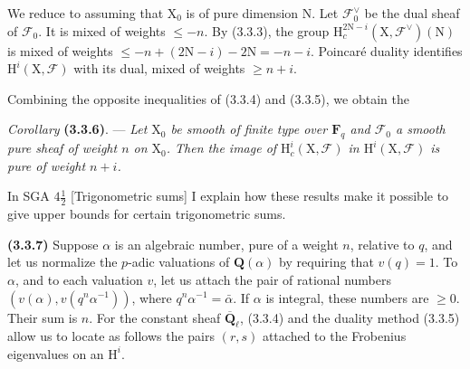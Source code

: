 \documentclass[11pt,leqno]{article}
\begin{document}
We reduce to assuming that \(\mathrm{X}_0\) is of pure dimension \(\mathrm{N}\). Let \(\mathscr{F}_0^\vee\) be the dual sheaf of \(\mathscr{F}_0\). It is mixed of weights \(\leq-n\). By (3.3.3), the group \(\mathrm{H}_c^{2\mathrm{N}-i}(\mathrm{X},\mathscr{F}^\vee)(\mathrm{N})\) is mixed of weights \(\leq-n+(2\mathrm{N}-i)-2\mathrm{N}=-n-i\). Poincaré duality identifies \(\mathrm{H}^i(\mathrm{X},\mathscr{F})\) with its dual, mixed of weights \(\geq n+i\).

Combining the opposite inequalities of (3.3.4) and (3.3.5), we obtain the

\textit{Corollary} \textbf{(3.3.6)}. — \textit{Let \(\mathrm{X}_0\) be smooth of finite type over \(\mathbf{F}_q\) and \(\mathscr{F}_0\) a smooth pure sheaf of weight \(n\) on \(\mathrm{X}_0\). Then the image of \(\mathrm{H}_c^i(\mathrm{X},\mathscr{F})\) in \(\mathrm{H}^i(\mathrm{X},\mathscr{F})\) is pure of weight \(n+i\).}

In SGA \(4\frac{1}{2}\) [Trigonometric sums] I explain how these results make it possible to give upper bounds for certain trigonometric sums.

\textbf{(3.3.7)} Suppose \(\alpha\) is an algebraic number, pure of a weight \(n\), relative to \(q\), and let us normalize the \(p\)-adic valuations of \(\mathbf{Q}(\alpha)\) by requiring that \(v(q)=1\). To \(\alpha\), and to each valuation \(v\), let us attach the pair of rational numbers \((v(\alpha),v(q^n\alpha^{-1}))\), where \(q^n\alpha^{-1}=\bar{\alpha}\). If \(\alpha\) is integral, these numbers are \(\geq0\). Their sum is \(n\). For the constant sheaf \(\overline{\mathbf{Q}}_\ell\), (3.3.4) and the duality method (3.3.5) allow us to locate as follows the pairs \((r,s)\) attached to the Frobenius eigenvalues on an \(\mathrm{H}^i\).
\end{document}
